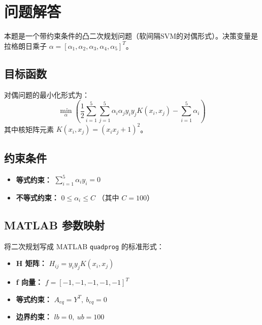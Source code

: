 \documentclass[11pt, a4paper]{article}
\begin{document}
	\section{问题解答}
	本题是一个带约束条件的凸二次规划问题（软间隔SVM的对偶形式）。决策变量是拉格朗日乘子 $\alpha = [\alpha_1, \alpha_2, \alpha_3, \alpha_4, \alpha_5]^T$。
	
	\subsection{目标函数}
	对偶问题的最小化形式为：
	\begin{equation}
		\min_{\alpha} \left( \frac{1}{2} \sum_{i=1}^{5}\sum_{j=1}^{5} \alpha_i \alpha_j y_i y_j K(x_i, x_j) - \sum_{i=1}^{5} \alpha_i \right)
	\end{equation}
	其中核矩阵元素 $K(x_i, x_j) = (x_i x_j + 1)^2$。
	
	\subsection{约束条件}
	\begin{itemize}
		\item \textbf{等式约束：} $\sum_{i=1}^{5} \alpha_i y_i = 0$
		\item \textbf{不等式约束：} $0 \le \alpha_i \le C$ （其中 $C=100$）
	\end{itemize}
	
	\subsection{MATLAB 参数映射}
	将二次规划写成 MATLAB \texttt{quadprog} 的标准形式：
	\begin{itemize}
		\item \textbf{H 矩阵：} $H_{ij} = y_i y_j K(x_i, x_j)$
		\item \textbf{f 向量：} $f = [-1, -1, -1, -1, -1]^T$
		\item \textbf{等式约束：} $A_{eq} = Y^T, \ b_{eq} = 0$
		\item \textbf{边界约束：} $lb = 0, \ ub = 100$
	\end{itemize}
	
\end{document}
